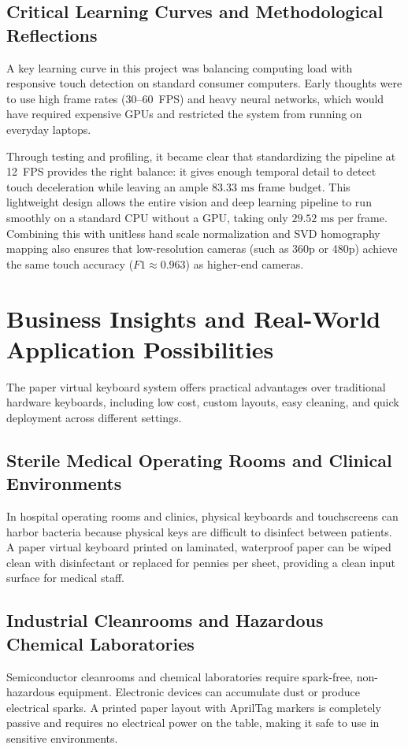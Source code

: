 \subsection{Critical Learning Curves and Methodological Reflections}
\label{subsec:concl_learning_curves}
A key learning curve in this project was balancing computing load with responsive touch detection on standard consumer computers. Early thoughts were to use high frame rates ($30\text{--}60$~FPS) and heavy neural networks, which would have required expensive GPUs and restricted the system from running on everyday laptops.

Through testing and profiling, it became clear that standardizing the pipeline at 12~FPS provides the right balance: it gives enough temporal detail to detect touch deceleration while leaving an ample $83.33\text{ ms}$ frame budget. This lightweight design allows the entire vision and deep learning pipeline to run smoothly on a standard CPU without a GPU, taking only $29.52\text{ ms}$ per frame. Combining this with unitless hand scale normalization and SVD homography mapping also ensures that low-resolution cameras (such as 360p or 480p) achieve the same touch accuracy ($F1 \approx 0.963$) as higher-end cameras.

\section{Business Insights and Real-World Application Possibilities}
\label{sec:concl_business}
The paper virtual keyboard system offers practical advantages over traditional hardware keyboards, including low cost, custom layouts, easy cleaning, and quick deployment across different settings.

\subsection{Sterile Medical Operating Rooms and Clinical Environments}
In hospital operating rooms and clinics, physical keyboards and touchscreens can harbor bacteria because physical keys are difficult to disinfect between patients. A paper virtual keyboard printed on laminated, waterproof paper can be wiped clean with disinfectant or replaced for pennies per sheet, providing a clean input surface for medical staff.

\subsection{Industrial Cleanrooms and Hazardous Chemical Laboratories}
Semiconductor cleanrooms and chemical laboratories require spark-free, non-hazardous equipment. Electronic devices can accumulate dust or produce electrical sparks. A printed paper layout with AprilTag markers is completely passive and requires no electrical power on the table, making it safe to use in sensitive environments.

